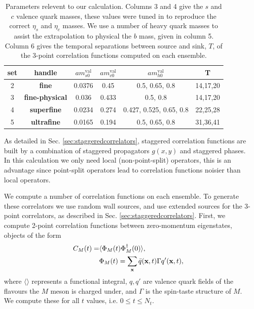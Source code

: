\begin{table}
  \begin{center}
    \begin{tabular}{c c c c c c}
      \hline
      set & handle & $am_{s0}^{\text{val}}$ & $am_{c0}^{\text{val}}$ & $am^{\text{val}}_{h0}$ & T \\ [0.5ex]
      \hline
      2 & \bf{fine} & 0.0376 & 0.45 
      & 0.5, 0.65, 0.8 & 14,17,20 \\ [1ex]
      3 & \bf{fine-physical} & 0.036 & 0.433 
      & 0.5, 0.8 & 14,17,20 \\ [1ex]
      4 & \bf{superfine} & 0.0234 & 
      0.274 & 0.427, 0.525, 0.65, 0.8  & 22,25,28  \\ [1ex]
      5 & \bf{ultrafine} & 0.0165 
      & 0.194 & 0.5, 0.65, 0.8 & 31,36,41\\ [1ex]
      \hline
    \end{tabular}
  \end{center}
  \caption{Parameters relevent to our calculation. Columns 3 and 4 give the $s$ and $c$ valence quark masses, these values were tuned in \cite{Chakraborty:2014aca} to reproduce the correct $\eta_s$ and $\eta_c$ masses. We use a number of heavy quark masses to assist the extrapolation to physical the $b$ mass, given in column 5. Column 6 gives the temporal separations between source and sink, $T$, of the 3-point correlation functions computed on each ensemble.}
  \label{tab:BsDsensembles}
\end{table}

As detailed in Sec. \ref{sec:staggeredcorrelators}, staggered correlation functions are built by a combination of staggered propagators $g(x,y)$ and staggered phases. In this calculation we only need local (non-point-split) operators, this is an advantage since point-split operators lead to correlation functions noisier than local operators. 

We compute a number of correlation functions on each ensemble. To generate these correlators we use random wall sources, and use extended sources for the 3-point correlators, as described in Sec. \ref{sec:staggeredcorrelators}. First, we compute 2-point correlation functions between zero-momentum eigenstates, objects of the form
\begin{align}
  C_{M}(t) =& \langle \Phi_M (t) \Phi_M^{\dagger}(0) \rangle, \\ 
  &\Phi_M(t) = \sum_{{\bf{x}}} \bar{q}({\bf{x}},t) \Gamma q'({\bf{x}},t), \nonumber
\end{align}
where $\langle \rangle$ represents a functional integral, $q,q'$ are valence quark fields of the flavours the $M$ meson is charged under, and $\Gamma$ is the spin-taste structure of $M$. We compute these for all $t$ values, i.e. $0\leq t \leq N_t$. 

